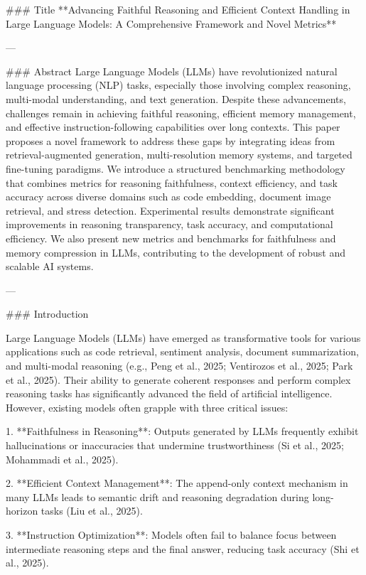 ### Title  
**Advancing Faithful Reasoning and Efficient Context Handling in Large Language Models: A Comprehensive Framework and Novel Metrics**

---

### Abstract  
Large Language Models (LLMs) have revolutionized natural language processing (NLP) tasks, especially those involving complex reasoning, multi-modal understanding, and text generation. Despite these advancements, challenges remain in achieving faithful reasoning, efficient memory management, and effective instruction-following capabilities over long contexts. This paper proposes a novel framework to address these gaps by integrating ideas from retrieval-augmented generation, multi-resolution memory systems, and targeted fine-tuning paradigms. We introduce a structured benchmarking methodology that combines metrics for reasoning faithfulness, context efficiency, and task accuracy across diverse domains such as code embedding, document image retrieval, and stress detection. Experimental results demonstrate significant improvements in reasoning transparency, task accuracy, and computational efficiency. We also present new metrics and benchmarks for faithfulness and memory compression in LLMs, contributing to the development of robust and scalable AI systems.  

---

### Introduction  

Large Language Models (LLMs) have emerged as transformative tools for various applications such as code retrieval, sentiment analysis, document summarization, and multi-modal reasoning (e.g., Peng et al., 2025; Ventirozos et al., 2025; Park et al., 2025). Their ability to generate coherent responses and perform complex reasoning tasks has significantly advanced the field of artificial intelligence. However, existing models often grapple with three critical issues:  

1. **Faithfulness in Reasoning**: Outputs generated by LLMs frequently exhibit hallucinations or inaccuracies that undermine trustworthiness (Si et al., 2025; Mohammadi et al., 2025).  

2. **Efficient Context Management**: The append-only context mechanism in many LLMs leads to semantic drift and reasoning degradation during long-horizon tasks (Liu et al., 2025).  

3. **Instruction Optimization**: Models often fail to balance focus between intermediate reasoning steps and the final answer, reducing task accuracy (Shi et al., 2025).  

